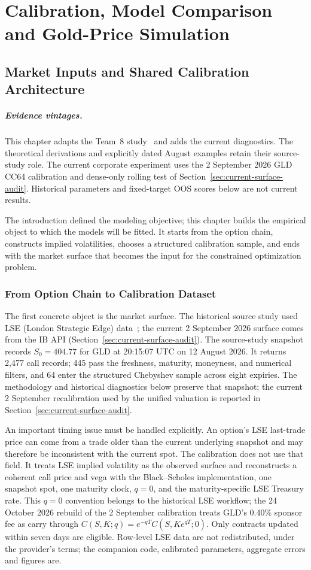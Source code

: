 \chapter{Calibration, Model Comparison and Gold-Price Simulation}
\label{ch:calibration}
\section{Market Inputs and Shared Calibration Architecture}
\paragraph{Evidence vintages.}
This chapter adapts the Team~8 study~\cite{team8} and adds the current diagnostics.
The theoretical derivations and explicitly dated August examples retain their
source-study role. The current corporate experiment uses the 2 September 2026
GLD CC64 calibration and dense-only rolling test of Section~\ref{sec:current-surface-audit}.
Historical parameters and fixed-target OOS scores below are not current results.


The introduction defined the modeling objective; this chapter builds the empirical object to which the models will be fitted. It starts from the option chain, constructs implied volatilities, chooses a structured calibration sample, and ends with the market surface that becomes the input for the constrained optimization problem.
\subsection{From Option Chain to Calibration Dataset}

The first concrete object is the market surface. The historical source study used LSE (London Strategic Edge) data~\cite{lse-2026}; the current 2 September 2026 surface comes from the IB API (Section~\ref{sec:current-surface-audit}). The source-study snapshot records \(S_0=404.77\) for GLD at 20:15:07 UTC on 12 August 2026. It returns 2,477 call records; 445 pass the freshness, maturity, moneyness, and numerical filters, and 64 enter the structured Chebyshev sample across eight expiries. The methodology and historical diagnostics below preserve that snapshot; the current 2 September recalibration used by the unified valuation is reported in Section~\ref{sec:current-surface-audit}.

An important timing issue must be handled explicitly. An option's LSE last-trade price can come from a trade older than the current underlying snapshot and may therefore be inconsistent with the current spot. The calibration does not use that field. It treats LSE implied volatility as the observed surface and reconstructs a coherent call price and vega with the Black--Scholes implementation, one snapshot spot, one maturity clock, \(q=0\), and the maturity-specific LSE Treasury rate. This \(q=0\) convention belongs to the historical LSE workflow; the 24 October 2026 rebuild of the 2 September calibration treats GLD's 0.40\% sponsor fee as carry through \(C(S,K;q)=e^{-qT}C(S,Ke^{qT};0)\). Only contracts updated within seven days are eligible. Row-level LSE data are not redistributed, under the provider's terms; the companion code, calibrated parameters, aggregate errors and figures are.

